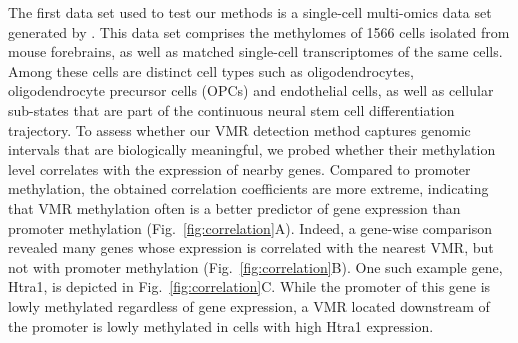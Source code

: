 \documentclass[twocolumn,10pt]{article}
\begin{document}
The first data set used to test our methods is a single-cell multi-omics data set generated by \citet{kremer_scnmt}.
This data set comprises the methylomes of 1566 cells isolated from mouse forebrains, as well as matched single-cell transcriptomes of the same cells.
Among these cells are distinct cell types such as oligodendrocytes, oligodendrocyte precursor cells (OPCs) and endothelial cells, as well as cellular sub-states that are part of the continuous neural stem cell differentiation trajectory.
To assess whether our VMR detection method captures genomic intervals that are biologically meaningful, we probed whether their methylation level correlates with the expression of nearby genes.
Compared to promoter methylation, the obtained correlation coefficients are more extreme, indicating that VMR methylation often is a better predictor of gene expression than promoter methylation (Fig.~\ref{fig:correlation}A).
Indeed, a gene-wise comparison revealed many genes whose expression is correlated with the nearest VMR, but not with promoter methylation (Fig.~\ref{fig:correlation}B).
One such example gene, Htra1, is depicted in Fig.~\ref{fig:correlation}C.
While the promoter of this gene is lowly methylated regardless of gene expression, a VMR located downstream of the promoter is lowly methylated in cells with high Htra1 expression.
\end{document}
